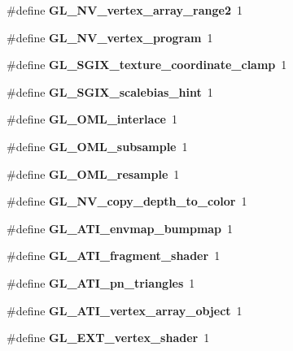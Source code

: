 \begin{DoxyCompactItemize}
\item 
\#define {\bfseries G\+L\+\_\+\+N\+V\+\_\+vertex\+\_\+array\+\_\+range2}~1\label{_s_d_l__opengl_8h_a16d29bf15764063bffbcc13b6c2229b8}

\item 
\#define {\bfseries G\+L\+\_\+\+N\+V\+\_\+vertex\+\_\+program}~1\label{_s_d_l__opengl_8h_a493ecff0ccdf5e8cdf033a02feedba94}

\item 
\#define {\bfseries G\+L\+\_\+\+S\+G\+I\+X\+\_\+texture\+\_\+coordinate\+\_\+clamp}~1\label{_s_d_l__opengl_8h_ac4f62e4bedb7e65f12be22e63026f504}

\item 
\#define {\bfseries G\+L\+\_\+\+S\+G\+I\+X\+\_\+scalebias\+\_\+hint}~1\label{_s_d_l__opengl_8h_ae1641098a74b286d2b43ab3a08edc3a3}

\item 
\#define {\bfseries G\+L\+\_\+\+O\+M\+L\+\_\+interlace}~1\label{_s_d_l__opengl_8h_ac76549439bf523904c16ea2b27e78726}

\item 
\#define {\bfseries G\+L\+\_\+\+O\+M\+L\+\_\+subsample}~1\label{_s_d_l__opengl_8h_adacd8cbfeb1a075149c02dfbc41522c7}

\item 
\#define {\bfseries G\+L\+\_\+\+O\+M\+L\+\_\+resample}~1\label{_s_d_l__opengl_8h_afbda2e4dfc0b396360a575b74dd40c52}

\item 
\#define {\bfseries G\+L\+\_\+\+N\+V\+\_\+copy\+\_\+depth\+\_\+to\+\_\+color}~1\label{_s_d_l__opengl_8h_a81844d43109d5dedcc2e186dea36aa8b}

\item 
\#define {\bfseries G\+L\+\_\+\+A\+T\+I\+\_\+envmap\+\_\+bumpmap}~1\label{_s_d_l__opengl_8h_a0c2accdaf940176f35e5caeffeff6434}

\item 
\#define {\bfseries G\+L\+\_\+\+A\+T\+I\+\_\+fragment\+\_\+shader}~1\label{_s_d_l__opengl_8h_ab624beea8f5b93099db7f43c31ca031b}

\item 
\#define {\bfseries G\+L\+\_\+\+A\+T\+I\+\_\+pn\+\_\+triangles}~1\label{_s_d_l__opengl_8h_af2f384840cbf89a3fba9c8eb4883928c}

\item 
\#define {\bfseries G\+L\+\_\+\+A\+T\+I\+\_\+vertex\+\_\+array\+\_\+object}~1\label{_s_d_l__opengl_8h_a24e8dfd8e3bdec6a16257ce84e80396c}

\item 
\#define {\bfseries G\+L\+\_\+\+E\+X\+T\+\_\+vertex\+\_\+shader}~1\label{_s_d_l__opengl_8h_a0d9ddf60184cd6c4c4bb5073d7e06468}


\end{DoxyCompactItemize}
